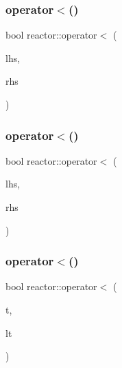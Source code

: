 \mbox{\label{namespacereactor_a92dbf562adb06209a1f5632d5e2a0155}} 
\subsubsection{\texorpdfstring{operator$<$()}{operator<()}\hspace{0.1cm}{\footnotesize\ttfamily [1/3]}}
{\footnotesize\ttfamily bool reactor\+::operator$<$ (\begin{DoxyParamCaption}\item[{const \hyperlink{classreactor_1_1Tag}{Tag} \&}]{lhs,  }\item[{const \hyperlink{classreactor_1_1Tag}{Tag} \&}]{rhs }\end{DoxyParamCaption})}

\mbox{\label{namespacereactor_a632f1427effbba727fcb9f5aa38d6e03}} 
\subsubsection{\texorpdfstring{operator$<$()}{operator<()}\hspace{0.1cm}{\footnotesize\ttfamily [2/3]}}
{\footnotesize\ttfamily bool reactor\+::operator$<$ (\begin{DoxyParamCaption}\item[{const \hyperlink{classreactor_1_1LogicalTime}{Logical\+Time} \&}]{lhs,  }\item[{const \hyperlink{classreactor_1_1Tag}{Tag} \&}]{rhs }\end{DoxyParamCaption})}

\mbox{\label{namespacereactor_acd3c1262138ace0007602d65740bc806}} 
\subsubsection{\texorpdfstring{operator$<$()}{operator<()}\hspace{0.1cm}{\footnotesize\ttfamily [3/3]}}
{\footnotesize\ttfamily bool reactor\+::operator$<$ (\begin{DoxyParamCaption}\item[{const \hyperlink{classreactor_1_1Tag}{Tag} \&}]{t,  }\item[{const \hyperlink{classreactor_1_1LogicalTime}{Logical\+Time} \&}]{lt }\end{DoxyParamCaption})\hspace{0.3cm}{\ttfamily [inline]}}

